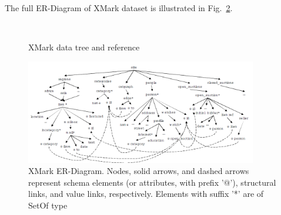 The full ER-Diagram of XMark dataset is illustrated in Fig.~\ref{fig:xmark-schema}. 
\begin{figure}[h]

	\centering
	\\
	\centering
	\caption{XMark data tree and reference~\citep{xmark/original}}
	\label{fig:xmark-tree-reference}
\end{figure}


\begin{figure}[h]
	\centering
	\includegraphics[width=0.90\textwidth]{img/xmark-schema-4}
	\caption{XMark ER-Diagram. Nodes, solid arrows, and dashed arrows represent schema elements (or attributes, with prefix '@'), structural links, and value links, respectively. Elements with suffix '*' are of SetOf type\citep{xmark/schema-sumerize}}
	\label{fig:xmark-schema}
\end{figure}

